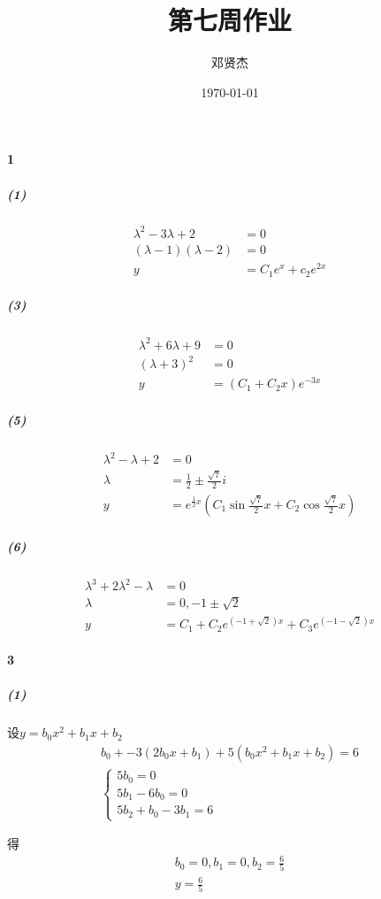\documentclass[UTF8]{ctexart}
\title{第七周作业}
\author{邓贤杰}
\date{\today}
\begin{document}
    \maketitle
    \paragraph*{1}
    \subparagraph*{(1)}
    \begin{align*}
        \lambda^2-3\lambda+2 &= 0 \\
        (\lambda -1)(\lambda - 2) &= 0 \\
        y &= C_1 e^x + c_2 e^{2x}
    \end{align*}
    \subparagraph*{(3)}
    \begin{align*}
        \lambda^2+6\lambda+9 &= 0 \\
        (\lambda +3)^2 &= 0 \\
        y &= (C_1 + C_2x)e^{-3x}
    \end{align*}
    \subparagraph*{(5)}
    \begin{align*}
        \lambda^2-\lambda+2 &= 0 \\
        \lambda &= \frac{1}{2} \pm \frac{\sqrt{7}}{2}i  \\
        y &= e^{\frac{1}{2} x}(C_1 \sin \frac{\sqrt{7}}{2}x + C_2 \cos \frac{\sqrt{7}}{2}x )
    \end{align*}
    \subparagraph*{(6)}
    \begin{align*}
        \lambda^3+2\lambda^2-\lambda &= 0 \\
        \lambda &= 0,-1\pm \sqrt{2} \\
        y &= C_1 + C_2 e^{(-1+\sqrt{2})x} + C_3 e^{(-1-\sqrt{2})x}
    \end{align*}
    \paragraph*{3}
    \subparagraph*{(1)}
    设$y = b_0 x^2 + b_1 x + b_2$
    \begin{align*}
        b_0 + -3(2b_0 x + b_1) + 5(b_0 x^2 + b_1 x + b_2) = 6 \\
        \begin{cases}
            5b_0 = 0 \\
            5b_1 -6b_0 = 0\\
            5b_2 + b_0 -3b_1 = 6
        \end{cases}
    \end{align*}

    得
    \begin{align*}
        b_0 = 0, b_1 = 0, b_2 = \frac{6}{5}\\y = \frac{6}{5}
    \end{align*}
    
\end{document}
